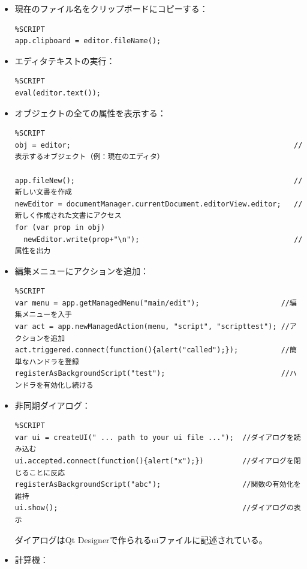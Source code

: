 \documentclass[]{book}
\begin{document}
\begin{itemize}
\item
  現在のファイル名をクリップボードにコピーする：

\begin{lstlisting}
%SCRIPT
app.clipboard = editor.fileName();
\end{lstlisting}
\item
  エディタテキストの実行：

\begin{lstlisting}
%SCRIPT
eval(editor.text());
\end{lstlisting}
\item
  オブジェクトの全ての属性を表示する：

\begin{lstlisting}
%SCRIPT
obj = editor;                                                    //表示するオブジェクト（例：現在のエディタ）

app.fileNew();                                                   //新しい文書を作成
newEditor = documentManager.currentDocument.editorView.editor;   //新しく作成された文書にアクセス
for (var prop in obj)
  newEditor.write(prop+"\n");                                    //属性を出力
\end{lstlisting}
\item
  編集メニューにアクションを追加：

\begin{lstlisting}
%SCRIPT
var menu = app.getManagedMenu("main/edit");                   //編集メニューを入手
var act = app.newManagedAction(menu, "script", "scripttest"); //アクションを追加
act.triggered.connect(function(){alert("called");});          //簡単なハンドラを登録
registerAsBackgroundScript("test");                           //ハンドラを有効化し続ける
\end{lstlisting}
\item
  非同期ダイアログ：

\begin{lstlisting}
%SCRIPT
var ui = createUI(" ... path to your ui file ...");  //ダイアログを読み込む
ui.accepted.connect(function(){alert("x");})         //ダイアログを閉じることに反応
registerAsBackgroundScript("abc");                   //関数の有効化を維持
ui.show();                                           //ダイアログの表示
\end{lstlisting}

  ダイアログはQt Designerで作られるuiファイルに記述されている。
\item
  計算機：


\end{itemize}
\end{document}
